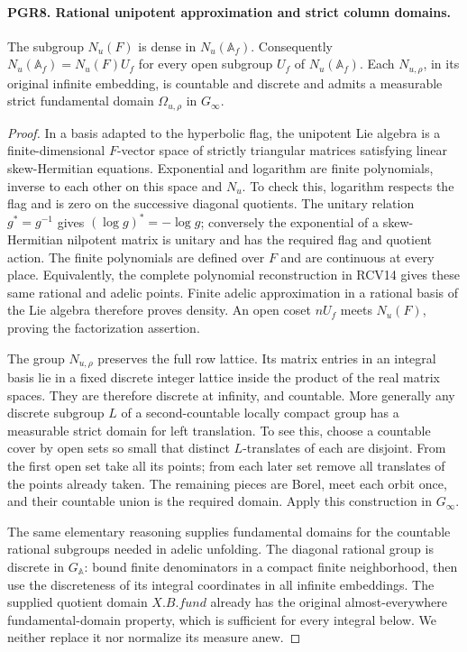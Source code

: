 \paragraph{PGR8. Rational unipotent approximation and strict column domains.}
\label{claim:PGR8}
The subgroup \(N_u(F)\) is dense in \(N_u(\mathbb A_f)\).
Consequently \(N_u(\mathbb A_f)=N_u(F)U_f\) for every open
subgroup \(U_f\) of \(N_u(\mathbb A_f)\).  Each
\(N_{u,\rho}\), in its original infinite embedding, is countable
and discrete and admits a measurable strict fundamental domain
\(\Omega_{u,\rho}\) in \(G_\infty\).
\begin{proof}
In a basis adapted to the hyperbolic flag, the unipotent Lie algebra
is a finite-dimensional \(F\)-vector space of strictly triangular
matrices satisfying linear skew-Hermitian equations.  Exponential
and logarithm are finite polynomials, inverse to each other on this
space and \(N_u\).  To check this, logarithm respects the flag and
is zero on the successive diagonal quotients.  The unitary relation
\(g^*=g^{-1}\) gives \((\log g)^*=-\log g\); conversely the
exponential of a skew-Hermitian nilpotent matrix is unitary and has
the required flag and quotient action.  The finite polynomials are
defined over \(F\) and are continuous at every place.
Equivalently, the complete polynomial reconstruction
in RCV14 gives these same rational and adelic points.  Finite adelic
approximation in a rational basis of the Lie algebra therefore proves
density.  An open coset \(nU_f\) meets \(N_u(F)\), proving the
factorization assertion.

The group \(N_{u,\rho}\) preserves the full row lattice.
Its matrix entries in an integral basis lie in a fixed discrete
integer lattice inside the product of the real matrix spaces.
They are therefore discrete at infinity, and countable.  More
generally any discrete subgroup \(L\) of a second-countable locally
compact group has a measurable strict domain for left translation.
To see this, choose a countable cover by open sets so small that
distinct \(L\)-translates of each are disjoint.  From the first
open set take all its points; from each later set remove all translates
of the points already taken.  The remaining pieces are Borel, meet
each orbit once, and their countable union is the required domain.
Apply this construction in \(G_\infty\).

The same elementary reasoning supplies fundamental domains for the
countable rational subgroups needed in adelic unfolding.  The
diagonal rational group is discrete in \(G_{\mathbb A}\): bound
finite denominators in a compact finite neighborhood, then use the
discreteness of its integral coordinates in all infinite embeddings.
The supplied quotient domain \(X.B.fund\) already has the original
almost-everywhere fundamental-domain property, which is sufficient
for every integral below.  We neither replace it nor normalize its
measure anew.
\end{proof}

